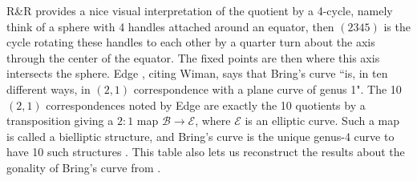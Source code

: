 \documentclass{amsart}
\begin{document}
R\&R \cite{Riera1992} provides a nice visual interpretation of the quotient by a 4-cycle, namely think of a sphere with 4 handles attached around an equator, then $(2345)$ is the cycle rotating these handles to each other by a quarter turn about the axis through the center of the equator. The fixed points are then where this axis intersects the sphere. 
Edge \cite{Edge1978}, citing Wiman, says that Bring's curve ``is, in ten different ways, in $(2,1)$ correspondence with a plane curve of genus 1".
The 10 $(2,1)$ correspondences noted by Edge are exactly the 10 quotients by a transposition giving a $2:1$ map $\mathcal{B} \to \mathcal{E}$, where $\mathcal{E}$ is an elliptic curve. Such a map is called a bielliptic structure, and Bring's curve is the unique genus-4 curve to have 10 such structures \cite{Casnati2005}. This table also lets us reconstruct the results about the gonality of Bring's curve from \cite{Gromadzki2010}. 

\end{document}
